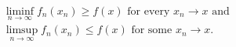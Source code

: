 \begin{align} & \liminf_{n \to \infty} f_{n}(x_n) \geq f(x) \text{ for every } x_n \to x \text{ and } \\ & \limsup_{n \to \infty} f_n(x_n) \leq f(x) \text{ for some } x_n \to x. \end{align}
